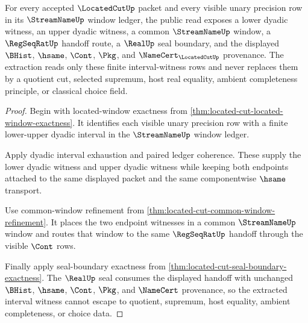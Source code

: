 \begin{theorem}
\label{thm:located-cut-interval-witness-extraction}
For every accepted $\LocatedCutUp$ packet and every visible unary precision row in its $\StreamNameUp$ window ledger, the public read exposes a lower dyadic witness, an upper dyadic witness, a common $\StreamNameUp$ window, a $\RegSeqRatUp$ handoff route, a $\RealUp$ seal boundary, and the displayed $\BHist$, $\hsame$, $\Cont$, $\Pkg$, and $\NameCert_{\LocatedCutUp}$ provenance. The extraction reads only these finite interval-witness rows and never replaces them by a quotient cut, selected supremum, host real equality, ambient completeness principle, or classical choice field.
\end{theorem}
\begin{proof}
Begin with located-window exactness from \autoref{thm:located-cut-located-window-exactness}. It identifies each visible unary precision row with a finite lower-upper dyadic interval in the $\StreamNameUp$ window ledger.

Apply dyadic interval exhaustion and paired ledger coherence. These supply the lower dyadic witness and upper dyadic witness while keeping both endpoints attached to the same displayed packet and the same componentwise $\hsame$ transport.

Use common-window refinement from \autoref{thm:located-cut-common-window-refinement}. It places the two endpoint witnesses in a common $\StreamNameUp$ window and routes that window to the same $\RegSeqRatUp$ handoff through the visible $\Cont$ rows.

Finally apply seal-boundary exactness from \autoref{thm:located-cut-seal-boundary-exactness}. The $\RealUp$ seal consumes the displayed handoff with unchanged $\BHist$, $\hsame$, $\Cont$, $\Pkg$, and $\NameCert$ provenance, so the extracted interval witness cannot escape to quotient, supremum, host equality, ambient completeness, or choice data.
\end{proof}

